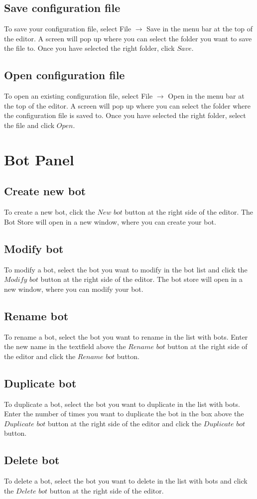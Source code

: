 \documentclass[a4paper]{article}
\begin{document}
\subsection{Save configuration file}
To save your configuration file, select File $\to$ Save in the menu bar at the top of the editor. A screen will pop up where you can select the folder you want to save the file to. Once you have selected the right folder, click $Save$.

\subsection{Open configuration file}
To open an existing configuration file, select File $\to$ Open in the menu bar at the top of the editor. A screen will pop up where you can select the folder where the configuration file is saved to. Once you have selected the right folder, select the file and click $Open$.

\section{Bot Panel}
\subsection{Create new bot}
To create a new bot, click the $New$ $bot$ button at the right side of the editor. The Bot Store will open in a new window, where you can create your bot.

\subsection{Modify bot}
To modify a bot, select the bot you want to modify in the bot list and click the $Modify$ $bot$ button at the right side of the editor. The bot store will open in a new window, where you can modify your bot.

\subsection{Rename bot}
To rename a bot, select the bot you want to rename in the list with bots. Enter the new name in the textfield above the $Rename$ $bot$ button at the right side of the editor and click the $Rename$ $bot$ button.

\subsection{Duplicate bot}
To duplicate a bot, select the bot you want to duplicate in the list with bots. Enter the number of times you want to duplicate the bot in the box above the $Duplicate$ $bot$ button at the right side of the editor and click the $Duplicate$ $bot$ button.

\subsection{Delete bot}
To delete a bot, select the bot you want to delete in the list with bots and click the $Delete$ $bot$ button at the right side of the editor.
\end{document}
